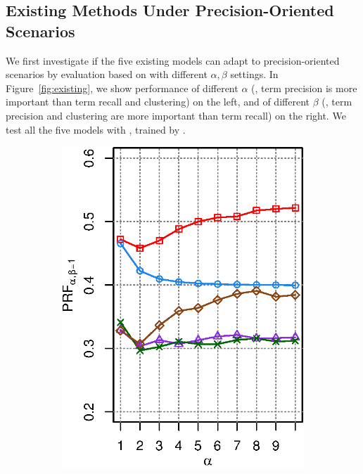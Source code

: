 \subsection{Existing Methods Under Precision-Oriented Scenarios}
\label{sec:precision-existing}
We first investigate if the five existing models can adapt to precision-oriented scenarios by evaluation based on \PRF with different $\alpha,\beta$ settings. In Figure~\ref{fig:existing}, we show \PRF performance of different $\alpha$ (\ie, term precision is more important than term recall and clustering) on the left, and of different $\beta$ (\ie, term precision and clustering are more important than term recall) on the right. We test all the five models with \QFI, \QFJ trained by \MLE. 
\begin{figure}[H]
\centering
\caption{$P\!R\!F_{\alpha,\beta}$ performance with different $\alpha$ (left, fixed $\beta\!=\!1$) and different $\beta$ (fixed $\alpha\!=\!1$, right) settings for existing methods on \DQF.}
\label{fig:existing}
\begin{subfigure}[b]{0.45\columnwidth}
\includegraphics[width=\columnwidth]{figure/qf13-prfa-5models.eps}

\end{subfigure}
\end{figure}
